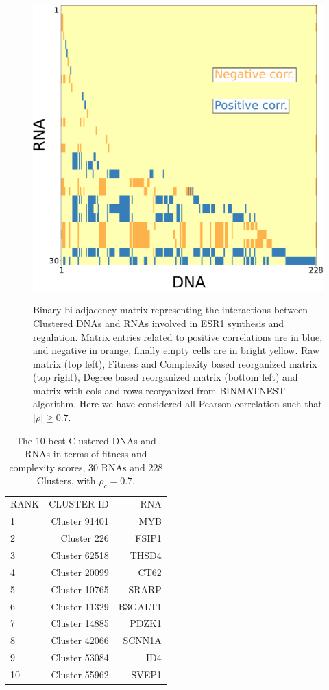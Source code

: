 \documentclass[10pt,a4paper]{article}
\begin{document}
\begin{figure}[h!]
\begin{center}
{\includegraphics[width=0.5\columnwidth]{FIG/ADN_c-ARN_BINMATNEST-Matrix-unit-0.7.pdf}
}
\end{center}
\caption{\label{fig:fig1}Binary bi-adjacency matrix representing the interactions between Clustered DNAs and RNAs involved in ESR1 synthesis and regulation. Matrix entries related to positive correlations are in blue, and negative in orange, finally empty cells are in bright yellow. Raw matrix (top left), Fitness and Complexity based reorganized matrix (top right), Degree based reorganized matrix (bottom left) and matrix with cols and rows reorganized from BINMATNEST algorithm. Here we have considered all Pearson correlation such that $|\rho| \geq 0.7$.}
\end{figure}
 \begin{table}[h!]
\centering
\caption{\label{tab:tab1} The 10 best Clustered DNAs and RNAs in terms of fitness and complexity scores, 30 RNAs and 228 Clusters, with $\rho_{c} = 0.7$.}
\begin{tabular}{l|r|r|}
\cline{1-3}
RANK & CLUSTER ID & RNA\\
\cline{1-3}
1 & Cluster 91401 & MYB\\
2 & Cluster 226 & FSIP1\\
3 & Cluster 62518 & THSD4\\
4 & Cluster 20099 & CT62\\
5 & Cluster 10765 & SRARP\\
6 & Cluster 11329 & B3GALT1\\
7 & Cluster 14885 & PDZK1\\
8 & Cluster 42066 & SCNN1A\\
9 & Cluster 53084 & ID4\\
10 & Cluster 55962 & SVEP1\\
\cline{1-3}
\end{tabular}
\end{table}
\end{document}
